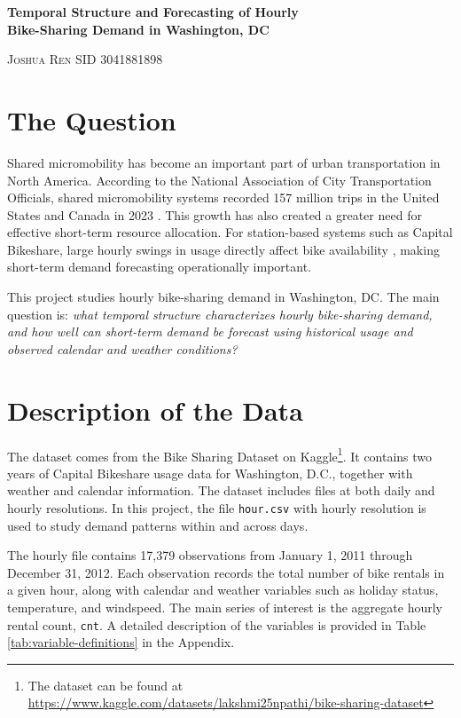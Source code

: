 \documentclass[11pt,letterpaper]{article}
\newcommand{\ProposalTitle}{Temporal Structure and Forecasting of Hourly\\Bike-Sharing Demand in Washington, DC}
\newcommand{\AuthorName}{Joshua Ren}
\newcommand{\AuthorSID}{3041881898}
\begin{document}
\begin{center}
  {\LARGE \bfseries \ProposalTitle \par}
  \vspace{1.1em}
  {\normalsize \textsc{\AuthorName} \quad {\normalfont |} \quad SID \AuthorSID \par}
\end{center}

\section{The Question}

Shared micromobility has become an important part of urban transportation in North America. According to the National Association of City Transportation Officials, shared micromobility systems recorded 157 million trips in the United States and Canada in 2023 \cite{nacto2024}. This growth has also created a greater need for effective short-term resource allocation. For station-based systems such as Capital Bikeshare, large hourly swings in usage directly affect bike availability \cite{capitalbikeshare2026}, making short-term demand forecasting operationally important.

This project studies hourly bike-sharing demand in Washington, DC. The main question is: \emph{what temporal structure characterizes hourly bike-sharing demand, and how well can short-term demand be forecast using historical usage and observed calendar and weather conditions?}

\section{Description of the Data}

The dataset comes from the Bike Sharing Dataset on Kaggle\footnote{The dataset can be found at \url{https://www.kaggle.com/datasets/lakshmi25npathi/bike-sharing-dataset}}. It contains two years of Capital Bikeshare usage data for Washington, D.C., together with weather and calendar information. The dataset includes files at both daily and hourly resolutions. In this project, the file \texttt{hour.csv} with hourly resolution is used to study demand patterns within and across days.

The hourly file contains 17,379 observations from January 1, 2011 through December 31, 2012. Each observation records the total number of bike rentals in a given hour, along with calendar and weather variables such as holiday status, temperature, and windspeed. The main series of interest is the aggregate hourly rental count, \texttt{cnt}. A detailed description of the variables is provided in Table \ref{tab:variable-definitions} in the Appendix.
\end{document}
